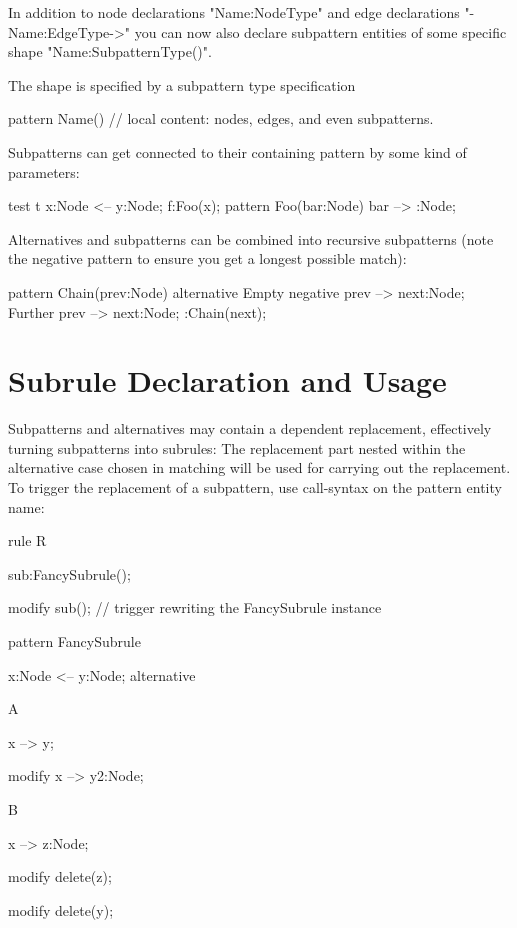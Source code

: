 In addition to node declarations "Name:NodeType" and edge declarations
"-Name:EdgeType->" you can now also declare subpattern entities of some
specific shape "Name:SubpatternType()".

The shape is specified by a subpattern type specification

pattern Name() {
  // local content: nodes, edges, and even subpatterns.
}

Subpatterns can get connected to their containing pattern 
by some kind of parameters:

\begin{example}
  \begin{grgen}
test t {
  x:Node <-- y:Node;
  f:Foo(x);
}
pattern Foo(bar:Node) {
  bar --> :Node;
}
  \end{grgen}
\end{example}

Alternatives and subpatterns can be combined into recursive subpatterns
(note the negative pattern to ensure you get a longest possible match):

\begin{example}
  \begin{grgen}
pattern Chain(prev:Node) {
  alternative {
    Empty {
      negative {
        prev --> next:Node;
      }
    }
    Further {
      prev --> next:Node;
      :Chain(next);
    }
  }
}
  \end{grgen}
\end{example}


\section{Subrule Declaration and Usage}
\label{nac}

Subpatterns and alternatives may contain a dependent replacement, effectively
turning subpatterns into subrules:
The replacement part nested within the alternative case chosen in matching
will be used for carrying out the replacement. To trigger the replacement of a
subpattern, use call-syntax on the pattern entity name:

\begin{example}
  \begin{grgen}
rule R {
  sub:FancySubrule();

  modify {
    sub();        // trigger rewriting the FancySubrule instance
  }
}

pattern FancySubrule {
  x:Node <-- y:Node;
  alternative {
    A {
      x --> y;

      modify {
        x --> y2:Node;
      }
    }
    B {
      x --> z:Node;

      modify {
        delete(z);
      }
    }
  }

  modify {
    delete(y);
  }
}
  \end{grgen}
\end{example}


